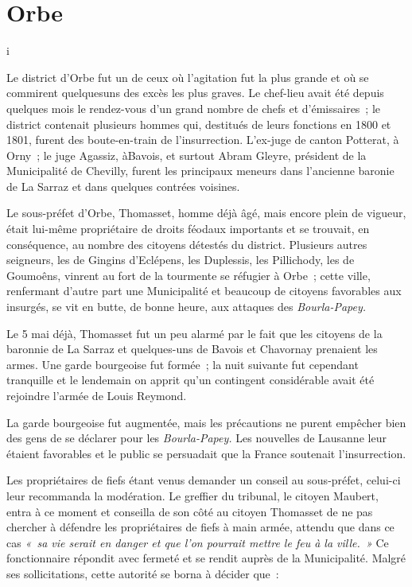 \documentclass[french,twoside]{book} %
\begin{document}
\section[{Orbe}]{Orbe}
\noindent i\par
Le district d’Orbe fut un de ceux où l’agitation fut la plus grande et où se commirent quelquesuns des excès les plus graves. Le chef-lieu avait été depuis quelques mois le rendez-vous d’un grand nombre de chefs et d’émissaires ; le district contenait plusieurs hommes qui, destitués de leurs fonctions en 1800 et 1801, furent des boute-en-train de l’insurrection. L’ex-juge de canton Potterat, à Orny ; le juge Agassiz, àBavois, et surtout Abram Gleyre, président de la Municipalité de Chevilly, furent les principaux meneurs dans l’ancienne baronie de La Sarraz et dans quelques contrées voisines.\par
Le sous-préfet d’Orbe, Thomasset, homme déjà âgé, mais encore plein de vigueur, était lui-même propriétaire de droits féodaux importants et se trouvait, en conséquence, au nombre des citoyens détestés du district. Plusieurs autres seigneurs, les de Gingins d’Eclépens, les Duplessis, les Pillichody, les de Goumoêns, vinrent au fort de la tourmente se réfugier à Orbe ; cette ville, renfermant d’autre part une Municipalité et beaucoup de citoyens favorables aux insurgés, se vit en butte, de bonne heure, aux attaques des \emph{Bourla-Papey.}\par
Le 5 mai déjà, Thomasset fut un peu alarmé par le fait que les citoyens de la baronnie de La Sarraz et quelques-uns de Bavois et Chavornay prenaient les armes. Une garde bourgeoise fut formée ; la nuit suivante fut cependant tranquille et le lendemain on apprit qu’un contingent considérable avait été rejoindre l’armée de Louis Reymond.\par
La garde bourgeoise fut augmentée, mais les précautions ne purent empêcher bien des gens de se déclarer pour les \emph{Bourla-Papey.} Les nouvelles de Lausanne leur étaient favorables et le public se persuadait que la France soutenait l’insurrection.\par
Les propriétaires de fiefs étant venus demander un conseil au sous-préfet, celui-ci leur recommanda la modération. Le greffier du tribunal, le citoyen Maubert, entra à ce moment et conseilla de son côté au citoyen Thomasset de ne pas chercher à défendre les propriétaires de fiefs à main armée, attendu que dans ce cas \emph{« sa vie serait en danger et que l’on pourrait mettre le feu à la ville. »} Ce fonctionnaire répondit avec fermeté et se rendit auprès de la Municipalité. Malgré ses sollicitations, cette autorité se borna à décider que :\par
\end{document}

